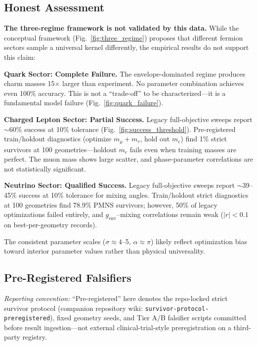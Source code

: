\documentclass[12pt,a4paper]{article}
\begin{document}
\subsection{Honest Assessment}

\textbf{The three-regime framework is not validated by this data.} While the conceptual framework (Fig.~\ref{fig:three_regime}) proposes that different fermion sectors sample a universal kernel differently, the empirical results do not support this claim:

\textbf{Quark Sector: Complete Failure.} The envelope-dominated regime produces charm masses 15$\times$ larger than experiment. No parameter combination achieves even 100\% accuracy. This is not a ``trade-off'' to be characterized---it is a fundamental model failure (Fig.~\ref{fig:quark_failure}).

\textbf{Charged Lepton Sector: Partial Success.} Legacy full-objective sweeps report $\sim$60\% success at 10\% tolerance (Fig.~\ref{fig:success_threshold}). Pre-registered train/holdout diagnostics (optimize $m_\mu + m_\tau$, hold out $m_e$) find 1\% strict survivors at 100 geometries---holdout $m_e$ fails even when training masses are perfect. The muon mass shows large scatter, and phase-parameter correlations are not statistically significant.

\textbf{Neutrino Sector: Qualified Success.} Legacy full-objective sweeps report $\sim$39--45\% success at 10\% tolerance for mixing angles. Train/holdout strict diagnostics at 100 geometries find 78.9\% PMNS survivors; however, 50\% of legacy optimizations failed entirely, and $g_{\text{env}}$--mixing correlations remain weak ($|r| < 0.1$ on best-per-geometry records).

The consistent parameter scales ($\sigma \approx 4$--5, $\alpha \approx \pi$) likely reflect optimization bias toward interior parameter values rather than physical universality.

\subsection{Pre-Registered Falsifiers}

\textit{Reporting convention:} ``Pre-registered'' here denotes the repo-locked strict survivor protocol (companion repository wiki: \texttt{survivor-protocol-preregistered}), fixed geometry seeds, and Tier A/B falsifier scripts committed before result ingestion---not external clinical-trial-style preregistration on a third-party registry.
\end{document}
